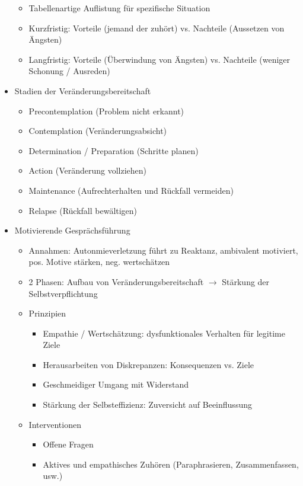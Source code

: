 \documentclass[11pt, paper=a4, twocolumn]{scrartcl}
\begin{document}
\begin{itemize}
				\begin{itemize}
					\item Tabellenartige Auflistung für spezifische Situation
					\item Kurzfristig: Vorteile (jemand der zuhört) vs. Nachteile (Aussetzen von Ängsten)
					\item Langfristig: Vorteile (Überwindung von Ängsten) vs. Nachteile (weniger Schonung / Ausreden)
				\end{itemize}
			\item Stadien der Veränderungsbereitschaft
				\begin{itemize}
					\item Precontemplation (Problem nicht erkannt)
					\item Contemplation (Veränderungsabsicht)
					\item Determination / Preparation (Schritte planen)
					\item Action (Veränderung vollziehen)
					\item Maintenance (Aufrechterhalten und Rückfall vermeiden)
					\item Relapse (Rückfall bewältigen)
				\end{itemize}
			\item Motivierende Gesprächsführung
				\begin{itemize}
					\item Annahmen: Autonmieverletzung führt zu Reaktanz, ambivalent motiviert, pos. Motive stärken, neg. 
						wertschätzen
					\item 2 Phasen: Aufbau von Veränderungsbereitschaft $\rightarrow$ Stärkung der Selbstverpflichtung
					\item Prinzipien
						\begin{itemize}
							\item Empathie / Wertschätzung: dysfunktionales Verhalten für legitime Ziele
							\item Herausarbeiten von Diskrepanzen: Konsequenzen vs. Ziele
							\item Geschmeidiger Umgang mit Widerstand
							\item Stärkung der Selbsteffizienz: Zuversicht auf Beeinflussung
						\end{itemize}
					\item Interventionen
						\begin{itemize}
							\item Offene Fragen
							\item Aktives und empathisches Zuhören (Paraphrasieren, Zusammenfassen, usw.)

\end{itemize}
\end{itemize}
\end{itemize}
\end{document}
